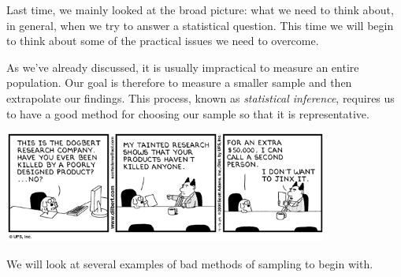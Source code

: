 



Last time, we mainly looked at the broad picture: what we need to think about, in general, when we try to
answer a statistical question. This time we will begin to think about some of the practical issues we need
to overcome.

As we've already discussed, it is usually impractical to measure an entire population. Our goal is therefore
to measure a smaller sample and then extrapolate our findings. This process, known as \emph{statistical inference},
requires us to have a good method for choosing our sample so that it is representative.

\begin{center}
  \includegraphics[width=0.8\textwidth]{dilbert-sampling}
\end{center}


We will look at several examples of bad methods of sampling to begin with.

